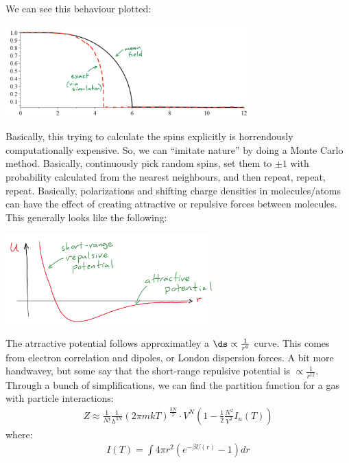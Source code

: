 \documentclass{article}
\begin{document}
We can see this behaviour plotted:
\begin{center}
  \includegraphics[width=0.7\textwidth]{images/magnet_phase.png}
\end{center}
 Basically, this trying to calculate the spins explicitly is horrendously computationally expensive. So, we can ``imitate nature'' by doing a Monte Carlo method. Basically, continuously pick random spins, set them to $\pm 1$ with probability calculated from the nearest neighbours, and then repeat, repeat, repeat.
\vfill\pagebreak
{}
Basically, polarizations and shifting charge densities in molecules/atoms can have the effect of creating attractive or repulsive forces between molecules. This generally looks like the following:
\begin{center}
  \includegraphics[width=0.6\textwidth]{images/vander.png}
\end{center}
The atrractive potential follows approximatley a $\ds \propto \frac{1}{r^6}$ curve. This comes from electron correlation and dipoles, or London dispersion forces. A bit more handwavey, but some say that the short-range repulsive potential is $\propto \frac{1}{r^12}$. Through a bunch of simplifications, we can find the partition function for a gas with particle interactions:
\begin{align*}
  Z \approx \frac{1}{N!}\frac{1}{h^{3N}} (2\pi m kT)^\frac{3N}{2} \cdot V^N \left(1 - \frac{1}{2} \frac{N^2}{V^2} I_u(T)\right)
\end{align*}
where:
\begin{align*}
  I(T) = \int 4\pi r^2 \left(e^{-\beta U(r)}- 1\right) dr
\end{align*}
\end{document}
